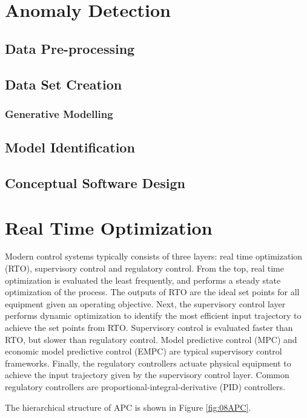 \section{Anomaly Detection}
\subsection{Data Pre-processing}
\subsection{Data Set Creation}
\subsubsection{Generative Modelling}
\subsection{Model Identification}
\subsection{Conceptual Software Design}

\section{Real Time Optimization}
Modern control systems typically consists of three layers: real time optimization (RTO), supervisory control and regulatory control.  From the top, real time optimization is evaluated the least frequently, and performs a steady state optimization of the process.  The outputs of RTO are the ideal set points for all equipment given an operating objective.  Next, the supervisory control layer performs dynamic optimization to identify the most efficient input trajectory to achieve the set points from RTO. Supervisory control is evaluated faster than RTO, but slower than regulatory control. Model predictive control (MPC) and economic model predictive control (EMPC) are typical supervisory control frameworks. Finally, the regulatory controllers actuate physical equipment to achieve the input trajectory given by the supervisory control layer.  Common regulatory controllers are proportional-integral-derivative (PID) controllers.

The hierarchical structure of APC is shown in Figure \ref{fig:08APC}.

